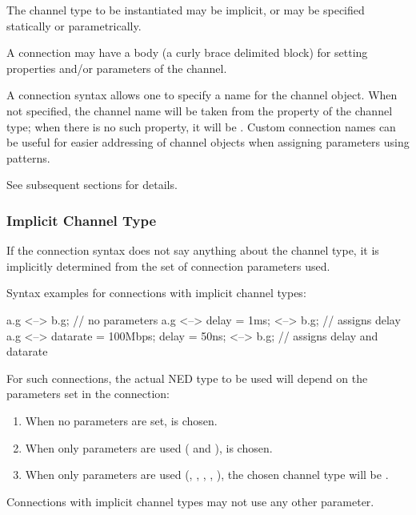 The channel type to be instantiated may be implicit, or may be specified
statically or parametrically.

A connection may have a body (a curly brace delimited block) for setting
properties and/or parameters of the channel.

A connection syntax allows one to specify a name for the channel object.
When not specified, the channel name will be taken from the 
property of the channel type; when there is no such property, it will be
. Custom connection names can be useful for easier addressing of
channel objects when assigning parameters using patterns.

See subsequent sections for details.


\subsubsection{Implicit Channel Type}
\label{sec:ned-ref:implicit-channel-type}

If the connection syntax does not say anything about the channel type, it
is implicitly determined from the set of connection parameters used.

Syntax examples for connections with implicit channel types:

\begin{ned}
a.g <--> b.g; // no parameters
a.g <--> {delay = 1ms;} <--> b.g;  // assigns delay
a.g <--> {datarate = 100Mbps; delay = 50ns;} <--> b.g; // assigns delay and datarate
\end{ned}

For such connections, the actual NED type to be used will depend on the
parameters set in the connection:

\begin{enumerate}
  \item When no parameters are set,  is chosen.
  \item When only  parameters are used (
        and ),  is chosen.
  \item When only  parameters are used
        (, , , , ),
        the chosen channel type will be .
\end{enumerate}

Connections with implicit channel types may not use any other parameter.

